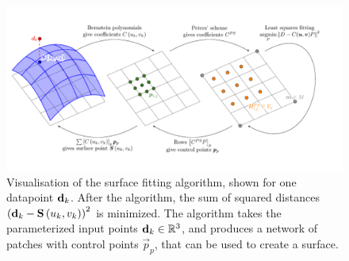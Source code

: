 \begin{figure}[H]
\begin{center}
\includegraphics[width=1.1\textwidth]{Pictures/tikzPeters/Peterscombined.pdf}
\end{center}
\caption{Visualisation of the \Bez surface fitting algorithm, shown for one datapoint $\lsDataPoint_k$. After the algorithm, the sum of squared distances $\left(\lsDataPoint_k - \vec{S}\left(u_k,v_k\right)\right)^2$ is minimized. The algorithm takes the parameterized input points $\lsDataPoint_k \in \mathbb{R}^3$, and produces a network of \Bez patches with control points $\vec{p}_{p}$, that can be used to create a surface.}
\label{fig:petersAlgorithm}
\end{figure}

